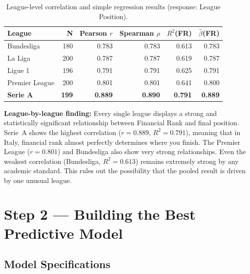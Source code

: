 \documentclass[11pt, a4paper]{article}
\begin{document}
\begin{table}[H]
  \centering
  \small
  \caption{League-level correlation and simple regression results (response: League Position).}
  \label{tab:leaguecorr}
  \begin{tabular}{l r r r r r}
    \toprule
    \rowcolor{NavyBlue}
    \color{white}\textbf{League} &
    \color{white}\textbf{N} &
    \color{white}\textbf{Pearson $r$} &
    \color{white}\textbf{Spearman $\rho$} &
    \color{white}\textbf{$R^{2}$(FR)} &
    \color{white}\textbf{$\hat{\beta}$(FR)} \\
    \midrule
    Bundesliga      & 180 & 0.783 & 0.783 & 0.613 & 0.783 \\
    \rowcolor{RowA}
    La Liga         & 200 & 0.787 & 0.787 & 0.619 & 0.787 \\
    Ligue 1         & 196 & 0.791 & 0.791 & 0.625 & 0.791 \\
    \rowcolor{RowA}
    Premier League  & 200 & 0.801 & 0.801 & 0.641 & 0.800 \\
    \rowcolor{RowB}
    \textbf{Serie A} & \textbf{199} & \textbf{0.889} & \textbf{0.890}
      & \textbf{0.791} & \textbf{0.889} \\
    \bottomrule
  \end{tabular}
\end{table}

\begin{findingbox}
  \textbf{League-by-league finding:} Every single league displays a strong and
  statistically significant relationship between Financial Rank and final position.
  Serie~A shows the highest correlation ($r = 0.889$, $R^{2} = 0.791$), meaning
  that in Italy, financial rank almost perfectly determines where you finish.
  The Premier League ($r = 0.801$) and Bundesliga also show very strong
  relationships. Even the weakest correlation (Bundesliga, $R^{2} = 0.613$)
  remains extremely strong by any academic standard. This rules out the
  possibility that the pooled result is driven by one unusual league.
\end{findingbox}

\section{Step 2 --- Building the Best Predictive Model}

\subsection{Model Specifications}
\end{document}
